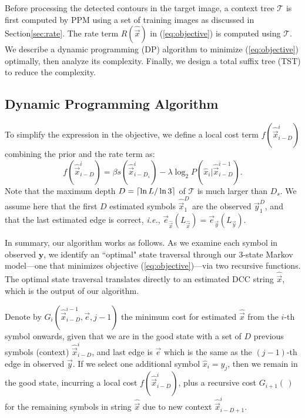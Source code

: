 Before processing the detected contours in the target image, a context tree $\mathcal{T}$ is first computed by PPM using a set of training images as discussed in Section\;\ref{sec:rate}.
The rate term $R(\hat{\vec{x}})$ in (\ref{eq:objective}) is computed using $\mathcal{T}$. 
We describe a dynamic programming (DP) algorithm to minimize (\ref{eq:objective}) optimally, then analyze its complexity. 
Finally, we design a total suffix tree (TST) to reduce the complexity.


\subsection{Dynamic Programming Algorithm}
\label{subsec:algorithm_dynamic}

To simplify the expression in the objective, we define a local cost term $f(\hat{\vec{x}}_{i-D}^{i})$ combining the prior and the rate term as:
\begin{equation}
f(\hat{\vec{x}}_{i-D}^{i}) = \beta s(\hat{\vec{x}}_{i-D_s}^i) - \lambda \log_2 P(\hat{x}_i|\hat{\vec{x}}_{i-D}^{i-1}).
\label{eq:local_cost}
\end{equation}
Note that the maximum depth $D=\lceil\ln{L}/\ln{3}\rceil$ of $\mathcal{T}$ is much larger than $D_s$.
We assume here that the first $D$ estimated symbols $\hat{\vec{x}}^D_1$ are the observed $\vec{y}^D_1$, and that the last estimated edge is correct, \textit{i.e.}, $\vec{e}_{\hat{\vec{x}}}(L_{\hat{\vec{x}}})=\vec{e}_{\vec{y}}(L_{\vec{y}})$. 


\addtocounter{equation}{2}

In summary, our algorithm works as follows. 
As we examine each symbol in observed $\mathbf{y}$, we identify an ``optimal" state traversal through our 3-state Markov model---one that minimizes objective (\ref{eq:objective})---via two recursive functions. The optimal state traversal translates directly to an estimated DCC string $\hat{\vec{x}}$, which is the output of our algorithm.

Denote by $G_i(\hat{\vec{x}}_{i-D}^{i-1},\vec{e},j-1)$ the minimum cost for estimated $\hat{\vec{x}}$ from the $i$-th symbol onwards, given that we are in the good state with a set of $D$ previous symbols (context) $\hat{\vec{x}}^{i}_{i-D}$, and last edge is $\vec{e}$ which is the same as the $(j-1)$-th edge  in observed $\vec{y}$. 
If we select one additional symbol $\hat{x}_i = y_j$, then we remain in the good state, incurring a local cost $f(\hat{\vec{x}}^i_{i-D})$, plus a recursive cost $G_{i+1}(\,)$ for the remaining symbols in string $\hat{\vec{x}}$ due to new context $\hat{\vec{x}}^i_{i-D+1}$. 

